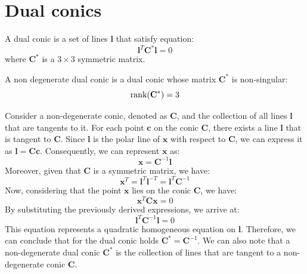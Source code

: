 \section{Dual conics}

\begin{definition}
    A dual conic is a set of lines $\mathbf{l}$ that satisfy equation:
    \[\mathbf{l}^T\mathbf{C}^\ast\mathbf{l}=0\]
    where $\mathbf{C}^\ast$ is a $3 \times 3$ symmetric matrix.
\end{definition}
\begin{definition}
    A non degenerate dual conic is a dual conic whose matrix $\mathbf{C}^\ast$ is non-singular: 
    \[\textnormal{rank}(\mathbf{C}^\ast)=3\]
\end{definition}
Consider a non-degenerate conic, denoted as $\mathbf{C}$, and the collection of all lines $\mathbf{l}$ that are tangents to it.
For each point $\mathbf{c}$ on the conic $\mathbf{C}$, there exists a line $\mathbf{l}$ that is tangent to $\mathbf{C}$. 
Since $\mathbf{l}$ is the polar line of $\mathbf{x}$ with respect to $\mathbf{C}$, we can express it as $\mathbf{l}=\mathbf{Cc}$.
Consequently, we can represent $\mathbf{x}$ as:
\[\mathbf{x}=\mathbf{C}^{-1}\mathbf{l}\]
Moreover, given that $\mathbf{C}$ is a symmetric matrix, we have:
\[\mathbf{x}^T=\mathbf{l}^T\mathbf{l}^{-T}=\mathbf{l}^T\mathbf{C}^{-1}\]
Now, considering that the point $\mathbf{x}$ lies on the conic $\mathbf{C}$, we have:
\[\mathbf{x}^T\mathbf{Cx}=0\]
By substituting the previously derived expressions, we arrive at:
\[\mathbf{l}^T\mathbf{C}^{-1}\mathbf{l}=0\]
This equation represents a quadratic homogeneous equation on $\mathbf{l}$. 
Therefore, we can conclude that for the dual conic holds $\mathbf{C}^\ast=\mathbf{C}^{-1}$. 
We can also note that a non-degenerate dual conic $\mathbf{C}^\ast$ is the collection of lines that are tangent to a non-degenerate conic $\mathbf{C}$.

